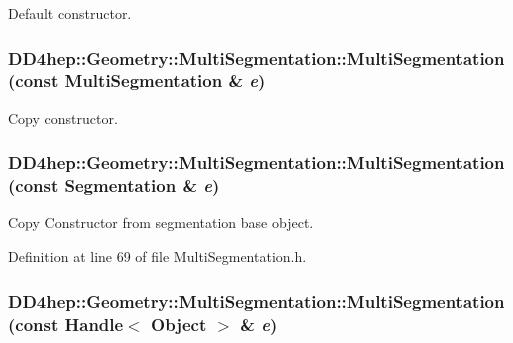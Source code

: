 Default constructor. \hypertarget{class_d_d4hep_1_1_geometry_1_1_multi_segmentation_afe1ecdac22ae72be46f40371512dbdcd}{
\subsubsection[{MultiSegmentation}]{\setlength{\rightskip}{0pt plus 5cm}DD4hep::Geometry::MultiSegmentation::MultiSegmentation (const {\bf MultiSegmentation} \& {\em e})}}
\label{class_d_d4hep_1_1_geometry_1_1_multi_segmentation_afe1ecdac22ae72be46f40371512dbdcd}


Copy constructor. \hypertarget{class_d_d4hep_1_1_geometry_1_1_multi_segmentation_ae419654849efd81b60901d521924244c}{
\subsubsection[{MultiSegmentation}]{\setlength{\rightskip}{0pt plus 5cm}DD4hep::Geometry::MultiSegmentation::MultiSegmentation (const {\bf Segmentation} \& {\em e})}}
\label{class_d_d4hep_1_1_geometry_1_1_multi_segmentation_ae419654849efd81b60901d521924244c}


Copy Constructor from segmentation base object. 

Definition at line 69 of file MultiSegmentation.h.\hypertarget{class_d_d4hep_1_1_geometry_1_1_multi_segmentation_a7ce624da1104ebe6d35c0cfa2d75aaad}{
\subsubsection[{MultiSegmentation}]{\setlength{\rightskip}{0pt plus 5cm}DD4hep::Geometry::MultiSegmentation::MultiSegmentation (const {\bf Handle}$<$ {\bf Object} $>$ \& {\em e})}}
\label{class_d_d4hep_1_1_geometry_1_1_multi_segmentation_a7ce624da1104ebe6d35c0cfa2d75aaad}


